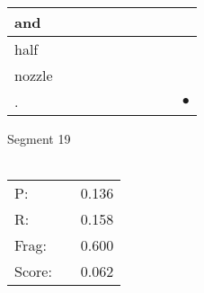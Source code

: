 \documentclass[landscape]{article}
\newcommand{\ssp}{\hspace{2pt}}
\newcommand{\mex}{\cellcolor{g}$\bullet$}
\begin{document}
\begin{tabular}{|l|p{10pt}|p{10pt}|p{10pt}|p{10pt}|p{10pt}|p{10pt}|p{10pt}|p{10pt}|p{10pt}|}
\hline
\ssp and \ssp&\hspace{2pt}&\hspace{2pt}&\hspace{2pt}&\hspace{2pt}&\hspace{2pt}&\hspace{2pt}&\hspace{2pt}&\hspace{2pt}&\hspace{2pt}\\
\hline
\ssp half \ssp&\hspace{2pt}&\hspace{2pt}&\hspace{2pt}&\hspace{2pt}&\hspace{2pt}&\hspace{2pt}&\hspace{2pt}&\hspace{2pt}&\hspace{2pt}\\
\hline
\ssp nozzle \ssp&\hspace{2pt}&\hspace{2pt}&\hspace{2pt}&\hspace{2pt}&\hspace{2pt}&\hspace{2pt}&\hspace{2pt}&\hspace{2pt}&\hspace{2pt}\\
\hline
\ssp \cellcolor{ref8}. \ssp&\hspace{2pt}&\hspace{2pt}&\hspace{2pt}&\hspace{2pt}&\hspace{2pt}&\hspace{2pt}&\hspace{2pt}&\hspace{2pt}&\hspace{2pt}\mex\\
\hline
\end{tabular}

\vspace{6pt}
\noindent Segment 19\\\\
\noindent\begin{tabular}{lm{12pt}r}
\hline
P:&&0.136\\
R:&&0.158\\
Frag:&&0.600\\
Score:&&0.062\\
\end{tabular}
\end{document}
